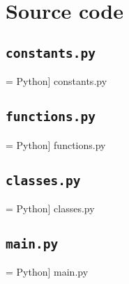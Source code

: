 \chapter* {Source code}

\section* {\texttt {constants.py}}

\lstset {
   language = Python,
   inputencoding = utf8,
   basicstyle=\footnotesize\ttfamily,
   breaklines=true
}

 = Python] {constants.py}

\section* {\texttt {functions.py}}

 = Python] {functions.py}

\section* {\texttt {classes.py}}

 = Python] {classes.py}

\section* {\texttt {main.py}}

 = Python] {main.py}



